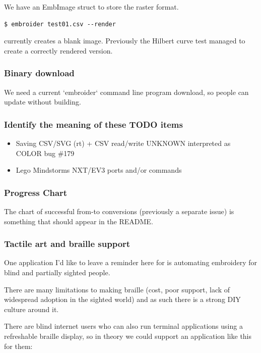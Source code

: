 \documentclass[a4paper, 11pt]{report}
\begin{document}
We have an EmbImage struct to store the raster format.

\begin{verbatim}
$ embroider test01.csv --render
\end{verbatim}

currently creates a blank image. Previously the Hilbert curve test managed to
create a correctly rendered version.

\subsubsection{Binary download}

We need a current `embroider` command line program download, so people can update
without building.

\subsubsection{Identify the meaning of these TODO items}

\begin{itemize}
\item Saving CSV/SVG (rt) + CSV read/write UNKNOWN interpreted as COLOR bug \#179
\item Lego Mindstorms NXT/EV3 ports and/or commands
\end{itemize}

\subsubsection{Progress Chart}

The chart of successful from-to conversions (previously a separate issue)
is something that should appear in the README.

\subsubsection{Tactile art and braille support}

One application I'd like to leave a reminder here for is automating embroidery
for blind and partially sighted people.

There are many limitations to making braille (cost, poor support, lack of
widespread adoption in the sighted world) and as such there is a strong DIY
culture around it.

There are blind internet users who can also run terminal applications using a
refreshable braille display, so in theory we could support an application like
this for them:
\end{document}
